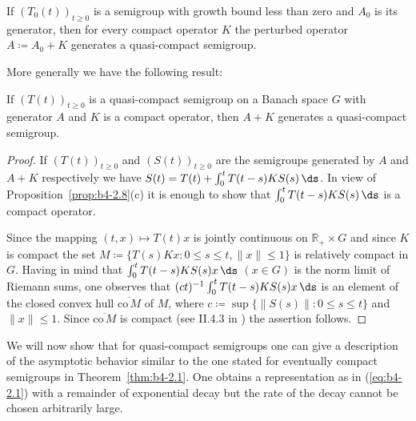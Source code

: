	If $(T_{0}(t))_{t \geq 0}$ is a semigroup with growth bound less than zero and $A_{0}$ is its generator, then for every compact operator $K$ the perturbed operator $A \coloneqq A_{0} + K$ generates a quasi-compact semigroup.
	
	More generally we have the following result:
	\begin{proposition}\label{prop:b4-2.9}
		If $(T(t))_{t \geq 0}$ is a quasi-compact semigroup on a Banach space $G$ with generator $A$ and $K$ is a compact operator, then $A + K$ generates a quasi-compact semigroup.
	\end{proposition}
\begin{proof}
	If $(T(t))_{t \geq 0}$ and $(S(t))_{t \geq 0}$ are the semigroups generated by $A$ and $A + K$ respectively we have $S(t) = T(t) + \int_0^t T(t-s)KS(s) \,\ds$.
	In view of Proposition~\ref{prop:b4-2.8}(c) it is enough to show that $\int_0^t T(t-s)KS(s) \,\ds$ is a compact operator.
	
	Since the mapping $(t,x) \mapsto T(t)x$ is jointly continuous on $\mathbb{R}_+ \times G$ and since $K$ is compact the set $M \coloneq \{T(s)Kx \colon 0 \leq s \leq t, \|x\| \leq 1\}$ is relatively compact in $G$. Having in mind that $\int_0^t T(t-s)KS(s)x \,\ds$ $(x \in G)$ is the norm limit of Riemann sums, one observes that 
	$(ct)^{-1}\int_0^t T(t-s)KS(s)x \,\ds$ is an element of the closed convex hull
	 $\overline{\mathrm{co}\, M}$ of $M$, where $c \coloneq \sup \{\|S(s)\| \colon 0 \leq s \leq t\}$ and $\|x\| \leq 1$. Since $\overline{\mathrm{co\,} M}$ is compact (see II.4.3 in \citet{schaefer:1966}) the assertion follows.
\end{proof}
%
%
\newpage 
%
%
We will now show that for quasi-compact semigroups one can give a description of the asymptotic behavior similar to the one stated for eventually compact semigroups in Theorem~\ref{thm:b4-2.1}. One obtains a representation as in (\ref{eq:b4-2.1}) with a remainder of exponential decay but the rate of the decay cannot be chosen arbitrarily large.
